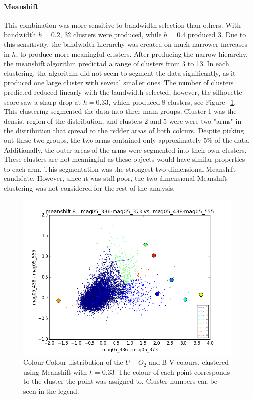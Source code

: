 \paragraph{Meanshift}
This combination was more sensitive to bandwidth selection than others.
With bandwidth $h=0.2$, $32$ clusters were produced, while $h=0.4$ produced $3$.
Due to this sensitivity, the bandwidth hierarchy was created on much narrower increases in $h$, to produce more meaningful clusters.
After producing the narrow hierarchy, the meanshift algorithm predictad a range of clusters from 3 to 13.
In each clustering, the algorithm did not seem to segment the data significantly, as it produced one large cluster with several smaller ones.
The number of clusters predicted reduced linearly with the bandwidth selected, however, the silhouette score saw a sharp drop at $h = 0.33$, which produced 8 clusters, see Figure ~\ref{fig:UOII2dMS}. 
This clustering segmented the data into three main groups.
Cluster 1 was the densist region of the distribution, and clusters 2 and 5 were were two "arms" in the distribution that spread to the redder areas of both colours.
Despite picking out these two groups, the two arms contained only approximately 5\% of the data. 
Additionally, the outer areas of the arms were segmented into their own clusters. 
These clusters are not meaningful as these objects would have similar properties to each arm.
This segmentation was the strongest two dimensional Meanshift candidate. 
However, since it was still poor, the two dimensional Meanshift clustering was not considered for the rest of the analysis. 

\begin{figure}
\centering
\includegraphics[width=\linewidth]{figs/successful/meanshift_color_8cl_mag05_336-mag05_373vsmag05_438-mag05_555}
\caption{Colour-Colour distribution of the $U-O_{2}$ and B-V colours, clustered using Meanshift with $h=0.33$. The colour of each point corresponds to the cluster the point was assigned to. Cluster numbers can be seen in the legend.}
\label{fig:UOII2dMS}
\end{figure}

